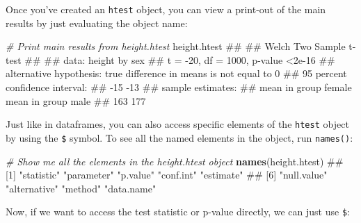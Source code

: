 \documentclass[]{book}
\newenvironment{Shaded}{\begin{snugshade}}{\end{snugshade}}
\newcommand{\KeywordTok}[1]{\textcolor[rgb]{0.13,0.29,0.53}{\textbf{#1}}}
\newcommand{\CommentTok}[1]{\textcolor[rgb]{0.56,0.35,0.01}{\textit{#1}}}
\newcommand{\OperatorTok}[1]{\textcolor[rgb]{0.81,0.36,0.00}{\textbf{#1}}}
\newcommand{\NormalTok}[1]{#1}
\theoremstyle{definition}
\theoremstyle{definition}
\theoremstyle{remark}
\begin{document}
Once you've created an \texttt{htest} object, you can view a print-out
of the main results by just evaluating the object name:

\begin{Shaded}
\begin{Highlighting}[]
\CommentTok{# Print main results from height.htest}
\NormalTok{height.htest}
\NormalTok{## }
\NormalTok{##  Welch Two Sample t-test}
\NormalTok{## }
\NormalTok{## data:  height by sex}
\NormalTok{## t = -20, df = 1000, p-value <2e-16}
\NormalTok{## alternative hypothesis: true difference in means is not equal to 0}
\NormalTok{## 95 percent confidence interval:}
\NormalTok{##  -15 -13}
\NormalTok{## sample estimates:}
\NormalTok{## mean in group female   mean in group male }
\NormalTok{##                  163                  177}
\end{Highlighting}
\end{Shaded}

Just like in dataframes, you can also access specific elements of the
\texttt{htest} object by using the \texttt{\$} symbol. To see all the
named elements in the object, run \texttt{names()}:

\begin{Shaded}
\begin{Highlighting}[]
\CommentTok{# Show me all the elements in the height.htest object}
\KeywordTok{names}\NormalTok{(height.htest)}
\NormalTok{## [1] "statistic"   "parameter"   "p.value"     "conf.int"    "estimate"   }
\NormalTok{## [6] "null.value"  "alternative" "method"      "data.name"}
\end{Highlighting}
\end{Shaded}

Now, if we want to access the test statistic or p-value directly, we can
just use \texttt{\$}:

\begin{Shaded}
\end{Shaded}
\end{document}
